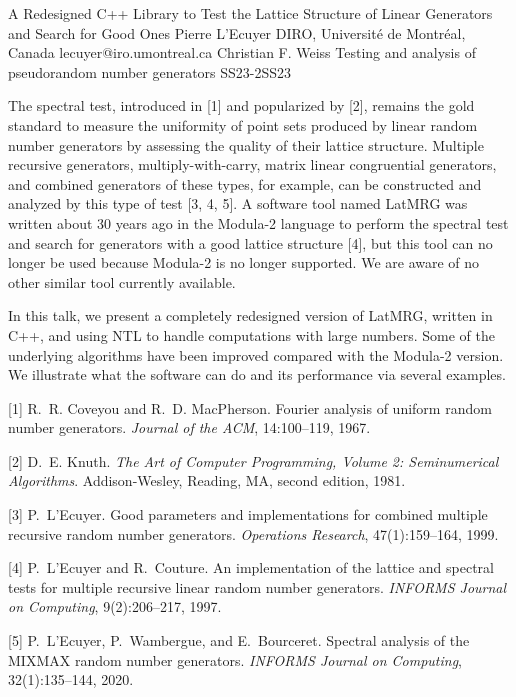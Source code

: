 \begin{talk}
  {A Redesigned C++ Library to Test the Lattice Structure of Linear Generators
	 and Search for Good Ones}%
  {Pierre L'Ecuyer}%
  {DIRO, Universit\'e de Montr\'eal, Canada}%
  {lecuyer@iro.umontreal.ca}%
  {Christian F. Weiss}%
{Testing and analysis of pseudorandom number generators}
{}{SS23-2}{SS23}


The spectral test, introduced in [1] and popularized by [2], 
remains the gold standard to measure the uniformity of point sets 
produced by linear random number generators by assessing the quality of their lattice structure.
Multiple recursive generators, multiply-with-carry, matrix linear congruential generators, 
and combined generators of these types, for example, can be constructed and analyzed 
by this type of test [3, 4, 5].  
A software tool named LatMRG was written about 30 years ago in the Modula-2 language 
to perform the spectral test and search for generators with a good lattice structure [4],
but this tool can no longer be used because Modula-2 is no longer supported. 
We are aware of no other similar tool currently available.

In this talk, we present a completely redesigned version of LatMRG, written in C++,
and using NTL to handle computations with large numbers. 
Some of the underlying algorithms have been improved compared with the Modula-2 version.
We illustrate what the software can do and its performance via several examples.

\medskip

[1] R.~R. Coveyou and R.~D. MacPherson.
Fourier analysis of uniform random number generators.
{\em Journal of the ACM}, 14:100--119, 1967.

[2] D.~E. Knuth.
{\em The Art of Computer Programming, Volume 2: Seminumerical Algorithms}.
Addison-Wesley, Reading, MA, second edition, 1981.

[3] P.~L'Ecuyer.
Good parameters and implementations for combined multiple recursive
  random number generators.
{\em Operations Research}, 47(1):159--164, 1999.

[4] P.~L'Ecuyer and R.~Couture.
An implementation of the lattice and spectral tests for multiple
  recursive linear random number generators.
{\em INFORMS Journal on Computing}, 9(2):206--217, 1997.

[5] P.~L'Ecuyer, P.~Wambergue, and E.~Bourceret.
Spectral analysis of the {MIXMAX} random number generators.
{\em INFORMS Journal on Computing}, 32(1):135--144, 2020.
%
\end{talk}

